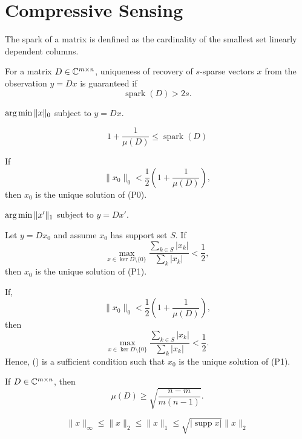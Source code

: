 \section{Compressive Sensing}

\begin{boxdefinition}[Spark]
    The spark of a matrix is denfined as the cardinality
    of the smallest set linearly dependent columns.
\end{boxdefinition}

\begin{boxtheorem}
    For a matrix $D\in\mathbb{C}^{m\times n}$, uniqueness of 
    recovery of $s$-sparse vectors $x$ from the 
    observation $y=Dx$ is guaranteed if 
    $${\operatorname{spark}(D)}>2s.$$
\end{boxtheorem}

\begin{boxdefinition}[P0]
    $\operatorname*{arg\,min} \|x\|_0$ subject to $y=Dx$.
\end{boxdefinition}

\begin{boxtheorem}
    $$
    1+\frac{1}{\mu(D)}\leq\operatorname{spark}(D)
    $$
\end{boxtheorem}

\begin{boxtheorem}
    If 
    $$
    \|x_0\|_0<\frac{1}{2}\left(1+\frac{1}{\mu(D)}\right),
    $$
    then $x_0$ is the unique solution of (P0).
\end{boxtheorem}

\begin{boxdefinition}[P1]
    $\operatorname*{arg\,min} \|x'\|_1$ subject to $y =Dx'$.
\end{boxdefinition}

\begin{boxtheorem}
    Let $y=Dx_0$ and assume $x_0$ has support set $S$.
    If 
    $$
    \max_{x\in\ker D\setminus\{0\}}
    \frac{\sum_{k\in S}|x_k|}{\sum_k|x_k|}<\frac{1}{2},
    $$
    then $x_0$ is the unique solution of (P1).
\end{boxtheorem}

\begin{boxtheorem}
    If,
    \begin{equation}
    \label{a}
    \|x_0\|_0<\frac{1}{2}\left(1+\frac{1}{\mu(D)}\right),
    \end{equation}
    then 
    $$
    \max_{x\in\ker D\setminus\{0\}}
    \frac{\sum_{k\in S}|x_k|}{\sum_k|x_k|}<\frac{1}{2}
    .$$
    Hence, () is a sufficient condition 
    such that $x_0$ is the unique solution of (P1).
\end{boxtheorem}

\begin{boxtheorem}
    If $D\in \mathbb{C}^{m\times n}$, then
    $$
    \mu(D)  \geq \sqrt{\frac{n-m}{m(n-1)}}.
    $$
\end{boxtheorem}

\begin{boxtheorem}
    $$\|x\|_\infty\leq\|x\|_2\leq\|x\|_1
    \leq\sqrt{|\operatorname{supp}x|}\|x\|_2$$
\end{boxtheorem}